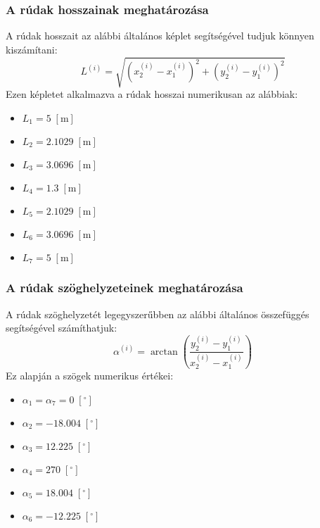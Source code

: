 \documentclass[12pt,a4paper]{article}
\def\m{\; \left[\mathrm{m}\right]}
\def\deg{\; \left[^{\circ}\right]}
\begin{document}
\subsubsection{A rúdak hosszainak meghatározása}
A rúdak hosszait az alábbi általános képlet segítségével tudjuk
könnyen kiszámítani:
\begin{equation}
    \boxed{L^{\left(i\right)}=\sqrt{\left(x^{\left(i\right)}_2-x^{\left(i\right)}_1\right)^2+
            \left(y^{\left(i\right)}_2-y^{\left(i\right)}_1\right)^2}}
\end{equation}
Ezen képletet alkalmazva a rúdak hosszai numerikusan az alábbiak:
\begin{multicols}{4}
    \begin{itemize}
        \item $L_1=5 \m$
        \item $L_2=2.1029 \m$
    \end{itemize}
    \columnbreak
    \begin{itemize}
        \item $L_3=3.0696 \m$
        \item $L_4=1.3 \m$
    \end{itemize}
    \columnbreak
    \begin{itemize}
        \item $L_5=2.1029 \m$
        \item $L_6=3.0696 \m$
    \end{itemize}
    \columnbreak
    \begin{itemize}
        \item $L_7=5 \m$
    \end{itemize}
\end{multicols}
\subsubsection{A rúdak szöghelyzeteinek meghatározása}
A rúdak szöghelyzetét legegyszerűbben az alábbi általános összefüggés
segítségével számíthatjuk:
\begin{equation}
    \boxed{\alpha^{\left(i\right)}=
        \arctan \left( \frac{y^{\left(i\right)}_2-y^{\left(i\right)}_1}
        {x^{\left(i\right)}_2-x^{\left(i\right)}_1}\right)}
\end{equation}
Ez alapján a szögek numerikus értékei:
\begin{multicols}{3}
    \begin{itemize}
        \item $\alpha_1=\alpha_7=0 \deg$
        \item $\alpha_2=-18.004 \deg$
    \end{itemize}
    \columnbreak
    \begin{itemize}
        \item $\alpha_3=12.225 \deg$
        \item $\alpha_4=270 \deg$
    \end{itemize}
    \columnbreak
    \begin{itemize}
        \item $\alpha_5=18.004 \deg$
        \item $\alpha_6=-12.225 \deg$
    \end{itemize}
\end{multicols}
\end{document}
